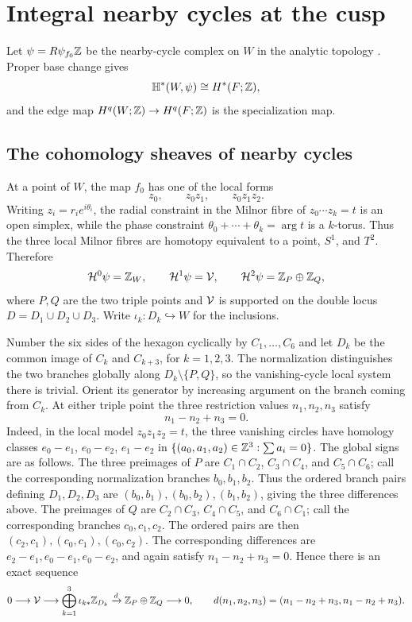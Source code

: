 \section{Integral nearby cycles at the cusp}\label{sec:nearby-cycles}

Let $\psi=R\psi_{f_0}\mathbb Z$ be the nearby-cycle complex on $W$ in the
analytic topology \cite[Ch.~4]{Dimca}.  Proper base change gives
\[
 \mathbb H^*(W,\psi)\cong H^*(F;\mathbb Z),
\]
and the edge map
$H^q(W;\mathbb Z)\to H^q(F;\mathbb Z)$ is the specialization map.

\subsection{The cohomology sheaves of nearby cycles}
At a point of $W$, the map $f_0$ has one of the local forms
\[
 z_0,
 \qquad
 z_0z_1,
 \qquad
 z_0z_1z_2.
\]
Writing $z_i=r_ie^{i\theta_i}$, the radial constraint in the Milnor
fibre of $z_0\cdots z_k=t$ is an open simplex, while the phase constraint
$\theta_0+\cdots+\theta_k=\arg t$ is a $k$-torus.  Thus the three local
Milnor fibres are homotopy equivalent to a point, $S^1$, and $T^2$.
Therefore
\[
 \mathcal H^0\psi=\mathbb Z_W,
 \qquad
 \mathcal H^1\psi=\mathcal V,
 \qquad
 \mathcal H^2\psi=\mathbb Z_P\oplus\mathbb Z_Q,
\]
where $P,Q$ are the two triple points and $\mathcal V$ is supported on the double
locus $D=D_1\cup D_2\cup D_3$.  Write $\iota_k:D_k\hookrightarrow W$ for
the inclusions.

Number the six sides of the hexagon cyclically by
$C_1,\ldots,C_6$ and let $D_k$ be the common image of $C_k$ and
$C_{k+3}$, for $k=1,2,3$.  The normalization distinguishes the two
branches globally along $D_k\setminus\{P,Q\}$, so the vanishing-cycle
local system there is trivial.  Orient its generator by increasing
argument on the branch coming from $C_k$.  At either triple
point the three restriction values
$n_1,n_2,n_3$ satisfy
\[
 n_1-n_2+n_3=0.
\]
Indeed, in the local model $z_0z_1z_2=t$, the three vanishing circles have
homology classes $e_0-e_1$, $e_0-e_2$, $e_1-e_2$ in
$\{(a_0,a_1,a_2)\in\mathbb Z^3:\sum a_i=0\}$.  The global signs are as follows.
The three preimages of $P$ are
$C_1\cap C_2$, $C_3\cap C_4$, and $C_5\cap C_6$; call the corresponding
normalization branches $b_0,b_1,b_2$.  Thus the ordered branch pairs
defining $D_1,D_2,D_3$ are
$(b_0,b_1),(b_0,b_2),(b_1,b_2)$, giving the three differences above.
The preimages of $Q$ are
$C_2\cap C_3$, $C_4\cap C_5$, and $C_6\cap C_1$; call the corresponding
branches $c_0,c_1,c_2$.  The ordered pairs are then
$(c_2,c_1),(c_0,c_1),(c_0,c_2)$.  The corresponding differences are
$e_2-e_1,e_0-e_1,e_0-e_2$, and again satisfy
$n_1-n_2+n_3=0$.  Hence there is an exact sequence
\begin{equation}\label{eq:V-resolution}
 0\longrightarrow\mathcal V\longrightarrow
 \bigoplus_{k=1}^3\iota_{k*}\mathbb Z_{D_k}
 \xrightarrow{d}
 \mathbb Z_P\oplus\mathbb Z_Q\longrightarrow0,
 \qquad
 d(n_1,n_2,n_3)=(n_1-n_2+n_3,n_1-n_2+n_3).
\end{equation}

